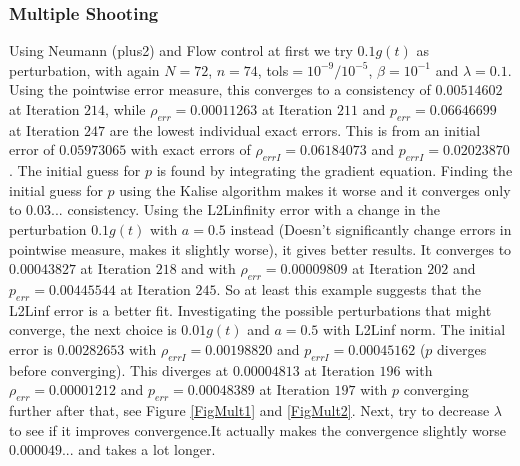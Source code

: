 \documentclass[11pt, a4paper]{article}
\theoremstyle{definition}
\begin{document}
\subsubsection*{Multiple Shooting}
Using Neumann (plus2) and Flow control at first we try $0.1g(t)$ as perturbation, with again $N=72$, $n=74$, tols$=10^{-9}/10^{-5}$, $\beta= 10^{-1}$ and $\lambda =0.1$. 
Using the pointwise error measure, this converges to a consistency of $0.00514602$ at Iteration $214$, while $\rho_{err} = 0.00011263$ at Iteration $211$ and $p_{err}=0.06646699$ at Iteration $247$ are the lowest individual exact errors. This is from an initial error of $0.05973065$ with exact errors of $\rho_{errI} = 0.06184073$ and $p_{errI} = 0.02023870$. The initial guess for $p$ is found by integrating the gradient equation. Finding the initial guess for $p$ using the Kalise algorithm makes it worse and it converges only to $0.03...$ consistency.
Using the L2Linfinity error with a change in the perturbation $0.1g(t)$ with $a=0.5$ instead (Doesn't significantly change errors in pointwise measure, makes it slightly worse), it gives better results.
It converges to $0.00043827$ at Iteration $218$ and with $\rho_{err} = 0.00009809$ at Iteration $202$ and $p_{err}= 0.00445544$ at Iteration $245$. So at least this example suggests that the L2Linf error is a better fit.
Investigating the possible perturbations that might converge, the next choice is $0.01g(t)$ and $a=0.5$ with L2Linf norm. The initial error is $0.00282653$ with $\rho_{errI}= 0.00198820$ and $p_{errI}=0.00045162$ ($p$ diverges before converging). This diverges at $0.00004813$ at Iteration $196$ with $\rho_{err} = 0.00001212$ and $p_{err} = 0.00048389$ at Iteration $197$ with $p$ converging further after that, see Figure \ref{FigMult1} and \ref{FigMult2}. 
Next, try to decrease $\lambda$ to see if it improves convergence.It actually makes the convergence slightly worse $0.000049...$ and takes a lot longer. 
\end{document}
